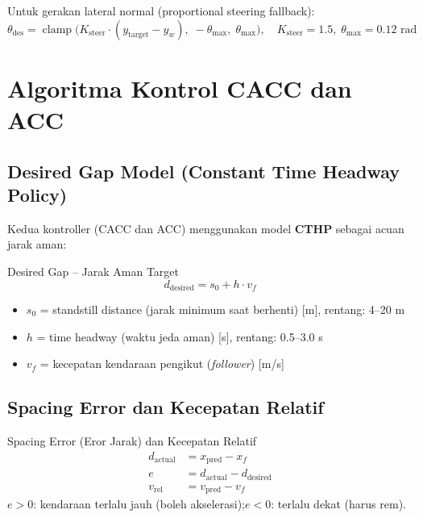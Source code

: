 \documentclass[12pt,a4paper]{article}
\begin{document}
Untuk gerakan lateral normal (proportional steering fallback):
\begin{equation}
  \theta_{\text{des}} = \operatorname{clamp}\!\bigl(K_{\text{steer}} \cdot (y_{\text{target}} - y_w),\; -\theta_{\max},\; \theta_{\max}\bigr), \quad K_{\text{steer}} = 1.5,\; \theta_{\max} = 0.12\text{ rad}
\end{equation}

\section{Algoritma Kontrol CACC dan ACC}

\subsection{Desired Gap Model (Constant Time Headway Policy)}

Kedua kontroller (CACC dan ACC) menggunakan model \textbf{CTHP} sebagai acuan jarak aman:

\begin{formulabox}{Desired Gap -- Jarak Aman Target}
\begin{equation}
  d_{\text{desired}} = s_0 + h \cdot v_f \label{eq:d_desired}
\end{equation}
\begin{itemize}[noitemsep]
  \item $s_0$ = standstill distance (jarak minimum saat berhenti) [m], rentang: 4--20 m
  \item $h$ = time headway (waktu jeda aman) [s], rentang: 0.5--3.0 s
  \item $v_f$ = kecepatan kendaraan pengikut (\textit{follower}) [m/s]
\end{itemize}
\end{formulabox}

\subsection{Spacing Error dan Kecepatan Relatif}

\begin{formulabox}{Spacing Error (Eror Jarak) dan Kecepatan Relatif}
\begin{align}
  d_{\text{actual}} &= x_{\text{pred}} - x_f \label{eq:d_actual}\\[4pt]
  e &= d_{\text{actual}} - d_{\text{desired}} \label{eq:spacing_err}\\[4pt]
  v_{\text{rel}} &= v_{\text{pred}} - v_f \label{eq:v_rel}
\end{align}
$e > 0$: kendaraan terlalu jauh (boleh akselerasi);\quad $e < 0$: terlalu dekat (harus rem).
\end{formulabox}
\end{document}
